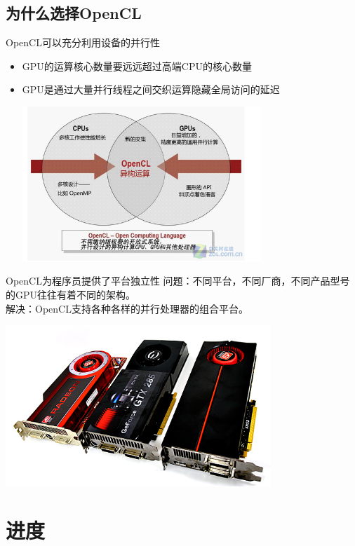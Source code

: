 \documentclass{beamer}
\begin{document}
\subsection{为什么选择OpenCL}
\begin{frame}{OpenCL可以充分利用设备的并行性}
    \begin{itemize}
          \item GPU的运算核心数量要远远超过高端CPU的核心数量
          \item GPU是通过大量并行线程之间交织运算隐藏全局访问的延迟
                \begin{center}
                \includegraphics[width=9cm]{parallel.png}
                \end{center}
    \end{itemize}       
\end{frame}

\begin{frame}{OpenCL为程序员提供了平台独立性}
     问题：不同平台，不同厂商，不同产品型号的GPU往往有着不同的架构。\\
     解决：OpenCL支持各种各样的并行处理器的组合平台。
     \begin{center}
     \includegraphics[width=10cm]{hardware.jpg}
     \end{center}
\end{frame}

\section{进度}
\end{document}
